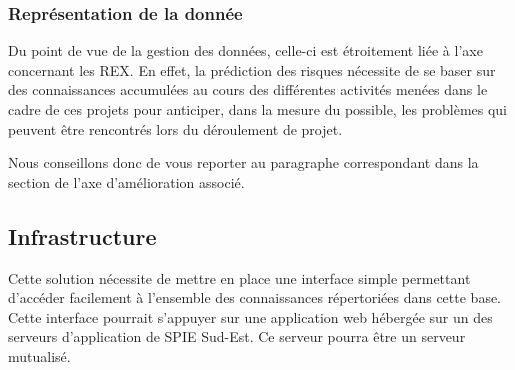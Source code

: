 \subsubsection{Représentation de la donnée}

Du point de vue de la gestion des données, celle-ci est étroitement liée à l’axe concernant les REX. En effet, la prédiction des risques nécessite de se baser sur des connaissances accumulées au cours des différentes activités menées dans le cadre de ces projets pour anticiper, dans la mesure du possible, les problèmes qui peuvent être rencontrés lors du déroulement de projet.

Nous conseillons donc de vous reporter au paragraphe correspondant dans la section de l’axe d’amélioration associé.

\subsection{Infrastructure}

Cette solution nécessite de mettre en place une interface simple permettant d’accéder facilement à l’ensemble des connaissances répertoriées dans cette base. Cette interface pourrait s’appuyer sur une application web hébergée sur un des serveurs d’application de SPIE Sud-Est. Ce serveur pourra être un serveur mutualisé.
